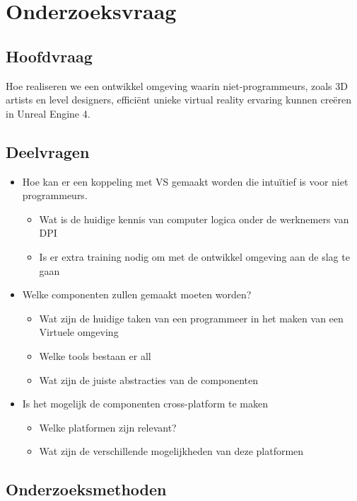 \section{Onderzoeksvraag}

\subsection{Hoofdvraag}

Hoe realiseren we een ontwikkel omgeving waarin niet-programmeurs, zoals 3D artists en level designers, efficiënt unieke virtual reality ervaring kunnen creëren in Unreal Engine 4.

\subsection{Deelvragen}

\begin{itemize}  
\item Hoe kan er een koppeling met VS gemaakt worden die intuïtief is voor niet programmeurs. 
	\begin{itemize}
	\item Wat is de huidige kennis van computer logica onder de werknemers van DPI
	\item Is er extra training nodig om met de ontwikkel omgeving aan de slag te gaan
	\end{itemize}
\item Welke componenten zullen gemaakt moeten worden?
	\begin{itemize}
	\item Wat zijn de huidige taken van een programmeer in het maken van een Virtuele omgeving
	\item Welke tools bestaan er all
	\item Wat zijn de juiste abstracties van de componenten 
	\end{itemize}
\item Is het mogelijk de componenten cross-platform te maken 
	\begin{itemize}
	\item Welke platformen zijn relevant?
	\item Wat zijn de verschillende mogelijkheden van deze platformen
	\end{itemize}
\end{itemize}

\subsection{Onderzoeksmethoden}

